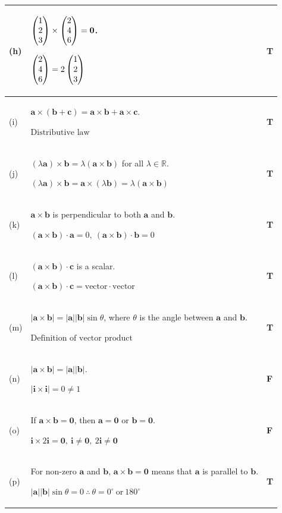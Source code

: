\documentclass[a4paper,11pt,oneside]{book}
\begin{document}
{\begin{longtable}{|>{\centering\arraybackslash}p{0.9cm}|p{\dimexpr\linewidth-0.9cm-1.6cm-6\tabcolsep-4\arrayrulewidth\relax}|>{\centering\arraybackslash}p{1.6cm}|}
(h)&$\begin{pmatrix}1\\2\\3\end{pmatrix}\times\begin{pmatrix}2\\4\\6\end{pmatrix}=\mathbf 0$.\par\smallskip $\displaystyle \begin{pmatrix}2\\4\\6\end{pmatrix}=2\begin{pmatrix}1\\2\\3\end{pmatrix}$\rule[-6pt]{0pt}{6pt}&\textbf{T}\\\hline
(i)&$\mathbf a\times(\mathbf b+\mathbf c)=\mathbf a\times\mathbf b+\mathbf a\times\mathbf c$.\par\smallskip $\displaystyle \text{Distributive law}$\rule[-6pt]{0pt}{6pt}&\textbf{T}\\\hline
(j)&$(\lambda\mathbf a)\times\mathbf b=\lambda(\mathbf a\times\mathbf b)$ for all $\lambda\in\mathbb R$.\par\smallskip $\displaystyle (\lambda\mathbf a)\times\mathbf b=\mathbf a\times(\lambda\mathbf b)=\lambda(\mathbf a\times\mathbf b)$\rule[-6pt]{0pt}{6pt}&\textbf{T}\\\hline
(k)&$\mathbf a\times\mathbf b$ is perpendicular to both $\mathbf a$ and $\mathbf b$.\par\smallskip $\displaystyle (\mathbf a\times\mathbf b)\cdot\mathbf a=0,\ (\mathbf a\times\mathbf b)\cdot\mathbf b=0$\rule[-6pt]{0pt}{6pt}&\textbf{T}\\\hline
(l)&$(\mathbf a\times\mathbf b)\cdot\mathbf c$ is a scalar.\par\smallskip $\displaystyle (\mathbf a\times\mathbf b)\cdot\mathbf c=\text{vector}\cdot\text{vector}$\rule[-6pt]{0pt}{6pt}&\textbf{T}\\\hline
(m)&$|\mathbf a\times\mathbf b|=|\mathbf a||\mathbf b|\sin\theta$, where $\theta$ is the angle between $\mathbf a$ and $\mathbf b$.\par\smallskip $\displaystyle \text{Definition of vector product}$\rule[-6pt]{0pt}{6pt}&\textbf{T}\\\hline
(n)&$|\mathbf a\times\mathbf b|=|\mathbf a||\mathbf b|$.\par\smallskip $\displaystyle |\mathbf i\times\mathbf i|=0\neq1$\rule[-6pt]{0pt}{6pt}&\textbf{F}\\\hline
(o)&If $\mathbf a\times\mathbf b=\mathbf 0$, then $\mathbf a=\mathbf 0$ or $\mathbf b=\mathbf 0$.\par\smallskip $\displaystyle \mathbf i\times2\mathbf i=\mathbf 0,\ \mathbf i\neq\mathbf 0,\ 2\mathbf i\neq\mathbf 0$\rule[-6pt]{0pt}{6pt}&\textbf{F}\\\hline
(p)&For non-zero $\mathbf a$ and $\mathbf b$, $\mathbf a\times\mathbf b=\mathbf 0$ means that $\mathbf a$ is parallel to $\mathbf b$.\par\smallskip $\displaystyle |\mathbf a||\mathbf b|\sin\theta=0\ \therefore\ \theta=0^\circ\ \text{or}\ 180^\circ$\rule[-6pt]{0pt}{6pt}&\textbf{T}\\\hline

\end{longtable}}
\end{document}
